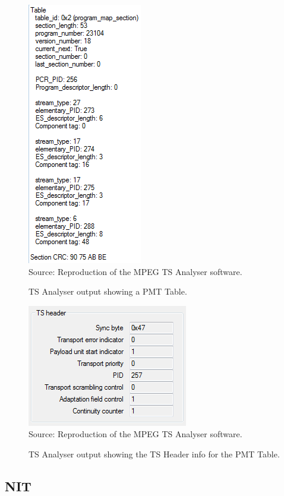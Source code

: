 \documentclass[
	12pt,				%
	openright,			%
	twoside,			%
	a4paper,			%
	brazil,
	french,				%
	english
	]{abntex2}
\begin{document}
\begin{figure}[!hb]
\centering
\caption{TS Analyser output showing a PMT Table.}
\includegraphics[width=0.4\linewidth]{figuras/TSAnalyser_close_PMT.png}
\\Source: Reproduction of the MPEG TS Analyser software.
\label{fig:TSAnalyser_close_PMT}
\end{figure}

\begin{figure}[!hb]
\centering
\caption{TS Analyser output showing the TS Header info for the PMT Table.}
\includegraphics[width=0.4\linewidth]{figuras/TSAnalyser_close_PMT_TS_Header.png}
\\Source: Reproduction of the MPEG TS Analyser software.
\label{fig:TSAnalyser_close_PMT_TS_Header}
\end{figure}

\subsection{NIT}
\end{document}

